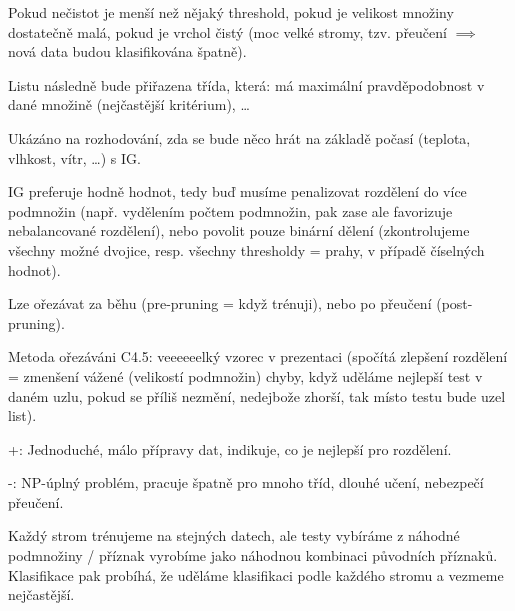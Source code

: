 \documentclass[12pt]{article}					%
\begin{document}
    \begin{definice}
        Pokud nečistot je menší než nějaký threshold, pokud je velikost množiny dostatečně malá, pokud je vrchol čistý (moc velké stromy, tzv. přeučení $\implies$ nová data budou klasifikována špatně).

        Listu následně bude přiřazena třída, která: má maximální pravděpodobnost v dané množině (nejčastější kritérium), …
    \end{definice}

    \begin{priklady}
        Ukázáno na rozhodování, zda se bude něco hrát na základě počasí (teplota, vlhkost, vítr, …) s IG.
    \end{priklady}

    \begin{upozorneni}
        IG preferuje hodně hodnot, tedy buď musíme penalizovat rozdělení do více podmnožin (např. vydělením počtem podmnožin, pak zase ale favorizuje nebalancované rozdělení), nebo povolit pouze binární dělení (zkontrolujeme všechny možné dvojice, resp. všechny thresholdy = prahy, v případě číselných hodnot).
    \end{upozorneni}

    \begin{definice}[Ořezávání = pruning]
        Lze ořezávat za běhu (pre-pruning = když trénuji), nebo po přeučení (post-pruning).

        Metoda ořezáváni C4.5: veeeeeelký vzorec v prezentaci (spočítá zlepšení rozdělení = zmenšení vážené (velikostí podmnožin) chyby, když uděláme nejlepší test v daném uzlu, pokud se příliš nezmění, nedejbože zhorší, tak místo testu bude uzel list). 
    \end{definice}

    \begin{poznamka}
        +: Jednoduché, málo přípravy dat, indikuje, co je nejlepší pro rozdělení.

        -: NP-úplný problém, pracuje špatně pro mnoho tříd, dlouhé učení, nebezpečí přeučení.
    \end{poznamka}

    \begin{definice}
        Každý strom trénujeme na stejných datech, ale testy vybíráme z náhodné podmnožiny / příznak vyrobíme jako náhodnou kombinaci původních příznaků. Klasifikace pak probíhá, že uděláme klasifikaci podle každého stromu a vezmeme nejčastější.
    \end{definice}
\end{document}
